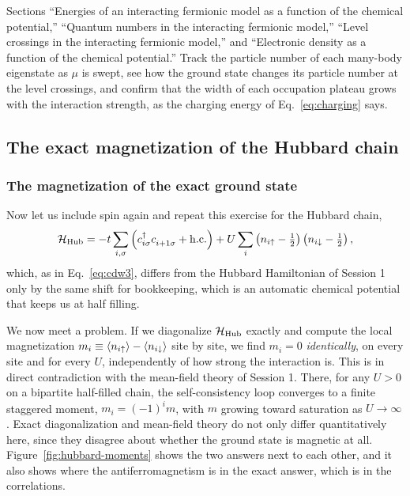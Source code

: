 \documentclass[lecture_notes.tex]{subfiles}
\begin{document}
\begin{notebook}
Sections ``Energies of an interacting fermionic model as a function of the chemical potential,''
``Quantum numbers in the interacting fermionic model,'' ``Level crossings in the interacting
fermionic model,'' and ``Electronic density as a function of the chemical potential.'' Track the
particle number of each many-body eigenstate as $\mu$ is swept, see how the ground state changes
its particle number at the level crossings, and confirm that the width of each occupation plateau
grows with the interaction strength, as the charging energy of Eq.~\eqref{eq:charging} says.
\end{notebook}

\subsection{The exact magnetization of the Hubbard chain}
\label{sec:hubbardmag}
\subsubsection{The magnetization of the exact ground state}
Now let us include spin again and repeat this exercise for the Hubbard chain,
\begin{equation}
  \Ham_{\mathrm{Hub}} = -t\sum_{i,\sigma}\left(\cre{i\sigma}\ann{i+1\sigma} + \mathrm{h.c.}\right)
    + U\sum_i \left(n_{i\up} - \tfrac12\right)\left(n_{i\dn} - \tfrac12\right),
  \label{eq:hub3}
\end{equation}
which, as in Eq.~\eqref{eq:cdw3}, differs from the Hubbard Hamiltonian of Session 1 only by the
same shift for bookkeeping, which is an automatic chemical potential that keeps us at half filling.

We now meet a problem. If we diagonalize $\mathcal{H}_{\mathrm{Hub}}$ exactly and compute the local
magnetization $m_i \equiv \expval{n_{i\uparrow}} - \expval{n_{i\downarrow}}$ site by site, we find $m_i = 0$
\emph{identically}, on every site and for every $U$, independently of how strong the interaction
is. This is in direct contradiction with the mean-field theory of Session 1. There, for any $U>0$
on a bipartite half-filled chain, the self-consistency loop converges to a finite staggered moment,
$m_i = (-1)^i m$, with $m$ growing toward saturation as $U\to\infty$. Exact diagonalization and
mean-field theory do not only differ quantitatively here, since they disagree about whether the
ground state is magnetic at all. Figure~\ref{fig:hubbard-moments} shows the two answers next to
each other, and it also shows where the antiferromagnetism is in the exact answer, which is in the
correlations.
\end{document}
